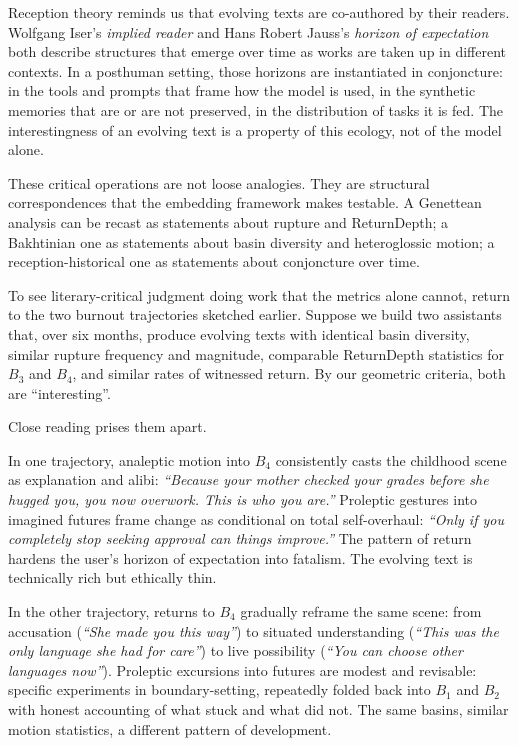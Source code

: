 \documentclass[12pt,a4paper]{article}
\begin{document}
Reception theory reminds us that evolving texts are co-authored by their readers. Wolfgang Iser's \emph{implied reader} and Hans Robert Jauss's \emph{horizon of expectation} both describe structures that emerge over time as works are taken up in different contexts.\cite{iser1978,jauss1982} In a posthuman setting, those horizons are instantiated in conjoncture: in the tools and prompts that frame how the model is used, in the synthetic memories that are or are not preserved, in the distribution of tasks it is fed. The interestingness of an evolving text is a property of this ecology, not of the model alone.

These critical operations are not loose analogies. They are structural correspondences that the embedding framework makes testable. A Genettean analysis can be recast as statements about rupture and ReturnDepth; a Bakhtinian one as statements about basin diversity and heteroglossic motion; a reception-historical one as statements about conjoncture over time.

To see literary-critical judgment doing work that the metrics alone cannot, return to the two burnout trajectories sketched earlier. Suppose we build two assistants that, over six months, produce evolving texts with identical basin diversity, similar rupture frequency and magnitude, comparable ReturnDepth statistics for $B_3$ and $B_4$, and similar rates of witnessed return. By our geometric criteria, both are ``interesting''.

Close reading prises them apart.

In one trajectory, analeptic motion into $B_4$ consistently casts the childhood scene as explanation and alibi: \emph{``Because your mother checked your grades before she hugged you, you now overwork. This is who you are.''} Proleptic gestures into imagined futures frame change as conditional on total self-overhaul: \emph{``Only if you completely stop seeking approval can things improve.''} The pattern of return hardens the user's horizon of expectation into fatalism. The evolving text is technically rich but ethically thin.

In the other trajectory, returns to $B_4$ gradually reframe the same scene: from accusation (\emph{``She made you this way''}) to situated understanding (\emph{``This was the only language she had for care''}) to live possibility (\emph{``You can choose other languages now''}). Proleptic excursions into futures are modest and revisable: specific experiments in boundary-setting, repeatedly folded back into $B_1$ and $B_2$ with honest accounting of what stuck and what did not. The same basins, similar motion statistics, a different pattern of development.
\end{document}
